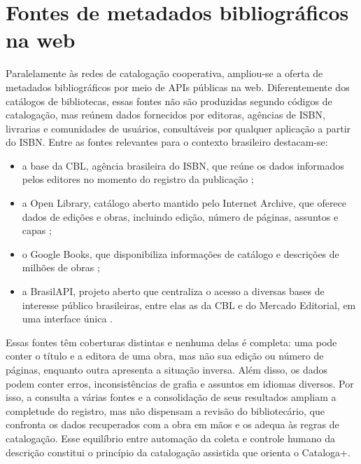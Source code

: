 \section{Fontes de metadados bibliográficos na web}
\label{sec:fontes}

Paralelamente às redes de catalogação cooperativa, ampliou-se a oferta de metadados bibliográficos por meio de APIs públicas na web. Diferentemente dos catálogos de bibliotecas, essas fontes não são produzidas segundo códigos de catalogação, mas reúnem dados fornecidos por editoras, agências de ISBN, livrarias e comunidades de usuários, consultáveis por qualquer aplicação a partir do ISBN. Entre as fontes relevantes para o contexto brasileiro destacam-se:

\begin{itemize}
    \item a base da CBL, agência brasileira do ISBN, que reúne os dados informados pelos editores no momento do registro da publicação \cite{cbl2021};
    \item a Open Library, catálogo aberto mantido pelo Internet Archive, que oferece dados de edições e obras, incluindo edição, número de páginas, assuntos e capas \cite{openlibrary};
    \item o Google Books, que disponibiliza informações de catálogo e descrições de milhões de obras \cite{googlebooks};
    \item a BrasilAPI, projeto aberto que centraliza o acesso a diversas bases de interesse público brasileiras, entre elas as da CBL e do Mercado Editorial, em uma interface única \cite{brasilapi}.
\end{itemize}

Essas fontes têm coberturas distintas e nenhuma delas é completa: uma pode conter o título e a editora de uma obra, mas não sua edição ou número de páginas, enquanto outra apresenta a situação inversa. Além disso, os dados podem conter erros, inconsistências de grafia e assuntos em idiomas diversos. Por isso, a consulta a várias fontes e a consolidação de seus resultados ampliam a completude do registro, mas não dispensam a revisão do bibliotecário, que confronta os dados recuperados com a obra em mãos e os adequa às regras de catalogação. Esse equilíbrio entre automação da coleta e controle humano da descrição constitui o princípio da catalogação assistida que orienta o Cataloga+.

